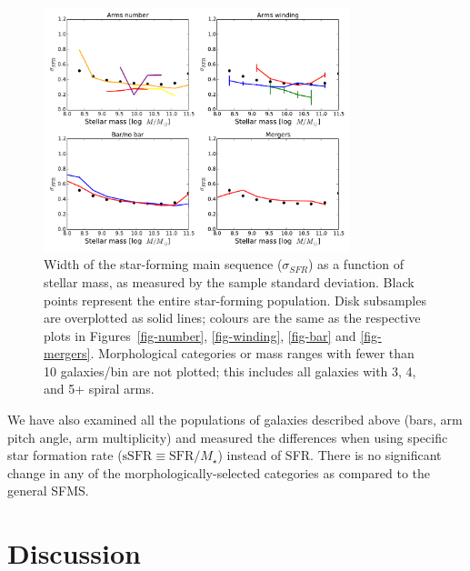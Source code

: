 \documentclass[useAMS,usenatbib]{mn2e}
\begin{document}
\begin{figure}
\includegraphics[angle=0,width=3.5in]{figures/masslim/sigma_mstar.pdf}
\caption{Width of the star-forming main sequence ($\sigma_{SFR}$) as a function of stellar mass, as measured by the sample standard deviation. Black points represent the entire star-forming population. Disk subsamples are overplotted as solid lines; colours are the same as the respective plots in Figures~\ref{fig-number}, \ref{fig-winding}, \ref{fig-bar} and \ref{fig-mergers}. Morphological categories or mass ranges with fewer than 10 galaxies/bin are not plotted; this includes all galaxies with 3, 4, and 5+ spiral arms.
\label{fig-sigma}}
\end{figure}

We have also examined all the populations of galaxies described above (bars, arm pitch angle, arm multiplicity) and measured the differences when using specific star formation rate ($\textrm{sSFR}\equiv\textrm{SFR}/M_\star$) instead of SFR. There is no significant change in any of the morphologically-selected categories as compared to the general SFMS. 


\section{Discussion}\label{sec-discussion}
\end{document}
